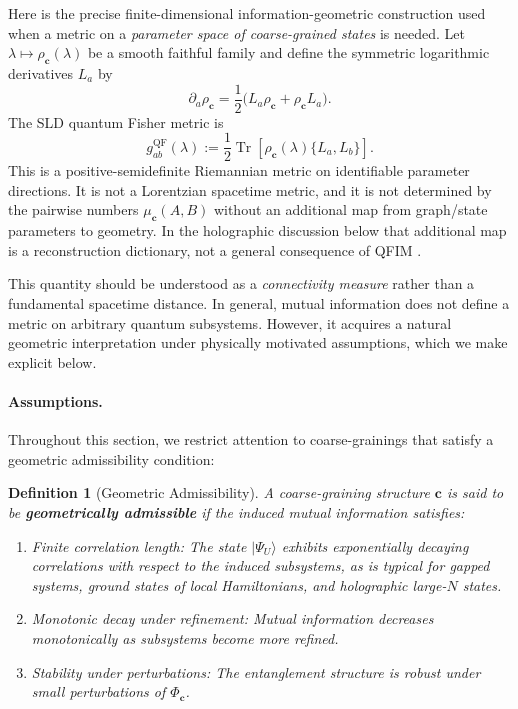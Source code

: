 \documentclass[12pt,a4paper,openany]{book}
\newtheorem{definition}[theorem]{Definition}
\begin{document}
Here is the precise finite-dimensional information-geometric construction used when a metric on a \emph{parameter space of coarse-grained states} is needed.  Let $\lambda\mapsto\rho_{\mathbf c}(\lambda)$ be a smooth faithful family and define the symmetric logarithmic derivatives $L_a$ by
\[
\partial_a\rho_{\mathbf c}
=\frac12\bigl(L_a\rho_{\mathbf c}+\rho_{\mathbf c}L_a\bigr).
\]
The SLD quantum Fisher metric is
\begin{equation}
g^{\mathrm{QF}}_{ab}(\lambda)
:=\frac12\operatorname{Tr}\!\left[
\rho_{\mathbf c}(\lambda)\{L_a,L_b\}\right].
\label{A-eq:qfim}
\end{equation}
This is a positive-semidefinite Riemannian metric on identifiable parameter directions.  It is not a Lorentzian spacetime metric, and it is not determined by the pairwise numbers $\mu_{\mathbf c}(A,B)$ without an additional map from graph/state parameters to geometry.  In the holographic discussion below that additional map is a reconstruction dictionary, not a general consequence of QFIM \cite{Petz1996}.

This quantity should be understood as a \emph{connectivity measure} rather than a fundamental spacetime distance.
In general, mutual information does not define a metric on arbitrary quantum subsystems.
However, it acquires a natural geometric interpretation under physically motivated assumptions, which we make explicit below.

\paragraph{Assumptions.}
Throughout this section, we restrict attention to coarse-grainings that satisfy a geometric admissibility condition:

\begin{definition}[Geometric Admissibility]
\label{A-def:geoadmit}
A coarse-graining structure $\mathbf{c}$ is said to be \textbf{geometrically admissible} if the induced mutual information satisfies:
\begin{enumerate}
\item \emph{Finite correlation length:} The state $|\Psi_U\rangle$ exhibits exponentially decaying correlations with respect to the induced subsystems, as is typical for gapped systems, ground states of local Hamiltonians, and holographic large-$N$ states.
\item \emph{Monotonic decay under refinement:} Mutual information decreases monotonically as subsystems become more refined.
\item \emph{Stability under perturbations:} The entanglement structure is robust under small perturbations of $\Phi_{\mathbf{c}}$.
\end{enumerate}
\end{definition}
\end{document}
